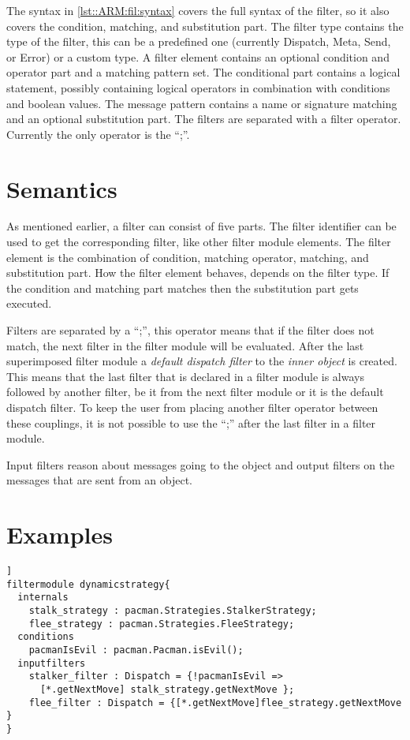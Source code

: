The syntax in \autoref{lst::ARM:fil:syntax} covers the full syntax of the filter, so it also covers the condition, matching, and substitution part.
The filter type contains the type of the filter, this can be a predefined one (currently Dispatch, Meta, Send, or Error) or a custom type.
A filter element contains an optional condition and operator part and a matching pattern set.
The conditional part contains a logical statement, possibly containing logical operators in combination with conditions and boolean values. 
The message pattern contains a name or signature matching and an optional substitution part. 
The filters are separated with a filter operator. 
Currently the only operator is the ``;''.

\section{Semantics}
As mentioned earlier, a filter can consist of five parts. 
The filter identifier can be used to get the corresponding filter, like other filter module elements. 
The filter element is the combination of condition, matching operator, matching, and substitution part.
How the filter element behaves, depends on the filter type. 
If the condition and matching part matches then the substitution part gets executed.

Filters are separated by a ``;'', this operator means that if the filter does not match, the next filter in the filter module will be evaluated. 
After the last superimposed filter module a \emph{default dispatch filter} to the \emph{inner object} is created. 
This means that the last filter that is declared in a filter module is always followed by another filter, be it from the next filter module or it is the default dispatch filter. 
To keep the user from placing another filter operator between these couplings, it is not possible to use the ``;'' after the last filter in a filter module.

Input filters reason about messages going to the object and output filters on the messages that are sent from an object. 

\section{Examples}
\begin{lstlisting}[caption = {Dynamic strategy filter module in Pacman}, label=lst::arm::fil:example1,style = listing, language = ComposeStar,float=[tpb]]
filtermodule dynamicstrategy{
  internals
    stalk_strategy : pacman.Strategies.StalkerStrategy;
    flee_strategy : pacman.Strategies.FleeStrategy;
  conditions
    pacmanIsEvil : pacman.Pacman.isEvil();
  inputfilters
    stalker_filter : Dispatch = {!pacmanIsEvil => 
      [*.getNextMove] stalk_strategy.getNextMove };
    flee_filter : Dispatch = {[*.getNextMove]flee_strategy.getNextMove }
}
\end{lstlisting}

